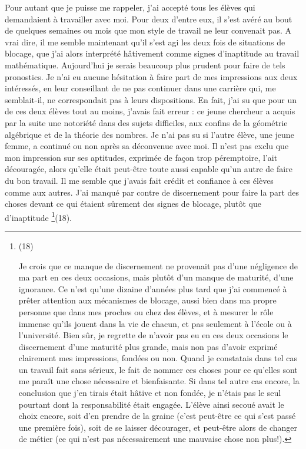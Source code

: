 Pour autant que je puisse me rappeler, j'ai accepté tous les élèves qui demandaient à travailler avec moi. Pour deux d'entre eux, il s'est avéré au bout de quelques semaines ou mois que mon style de travail ne leur convenait pas. A vrai dire, il me semble maintenant qu'il s'est agi les deux fois de situations de blocage, que j'ai alors interprété hâtivement comme signes d'inaptitude au travail mathématique. Aujourd'hui je serais beaucoup plus prudent pour faire de tels pronostics. Je n'ai eu aucune hésitation à faire part de mes impressions aux deux intéressés, en leur conseillant de ne pas continuer dans une carrière qui, me semblait-il, ne correspondait pas à leurs dispositions. En fait, j'ai su que pour un de ces deux élèves tout au moins, j'avais fait erreur : ce jeune chercheur a acquis par la suite une notoriété dans des sujets difficiles, aux confins de la géométrie algébrique et de la théorie des nombres. Je n'ai pas su si l'autre élève, une jeune femme, a continué ou non après sa déconvenue avec moi. Il n'est pas exclu que mon impression sur ses aptitudes, exprimée de façon trop péremptoire, l'ait découragée, alors qu'elle était peut-être toute aussi capable qu'un autre de faire du bon travail. Il me semble que j'avais fait crédit et confiance à ces élèves comme aux autres. J'ai manqué par contre de discernement pour faire la part des choses devant ce qui étaient sûrement des signes de blocage, plutôt que d'inaptitude \footnote{(18)\par Je crois que ce manque de discernement ne provenait pas d'une négligence de ma part en ces deux occasions, mais plutôt d'un manque de maturité, d'une ignorance. Ce n'est qu'une dizaine d'années plus tard que j'ai commencé à prêter attention aux mécanismes de blocage, aussi bien dans ma propre personne que dans mes proches ou chez des élèves, et à mesurer le rôle immense qu'ils jouent dans la vie de chacun, et pas seulement à l'école ou à l'université. Bien sûr, je regrette de n'avoir pas eu en ces deux occasions le discernement d'une maturité plus grande, mais non pas d'avoir exprimé clairement mes impressions, fondées ou non. Quand je constatais dans tel cas un travail fait sans sérieux, le fait de nommer ces choses pour ce qu'elles sont me paraît une chose nécessaire et bienfaisante. Si dans tel autre cas encore, la conclusion que j'en tirais était hâtive et non fondée, je n'étais pas le seul pourtant dont la responsabilité était engagée. L'élève ainsi secoué avait le choix encore, soit d'en prendre de la graine (c'est peut-être ce qui s'est passé une première fois), soit de se laisser décourager, et peut-être alors de changer de métier (ce qui n'est pas nécessairement une mauvaise chose non plus!).}(18).

